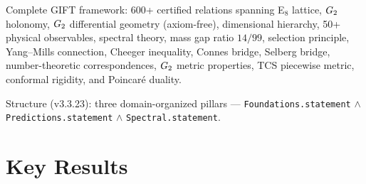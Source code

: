 \begin{theorem}\label{thm:grand_certificate}
    \leanok
    Complete GIFT framework: 600+ certified relations spanning
    E$_8$ lattice, $G_2$ holonomy, $G_2$ differential geometry (axiom-free),
    dimensional hierarchy, 50+ physical observables, spectral theory,
    mass gap ratio $14/99$, selection principle, Yang--Mills connection,
    Cheeger inequality, Connes bridge, Selberg bridge,
    number-theoretic correspondences, $G_2$ metric properties,
    TCS piecewise metric, conformal rigidity, and Poincar\'e duality.

    Structure (v3.3.23): three domain-organized pillars ---
    \texttt{Foundations.statement} $\wedge$
    \texttt{Predictions.statement} $\wedge$
    \texttt{Spectral.statement}.
\end{theorem}

\section{Key Results}

